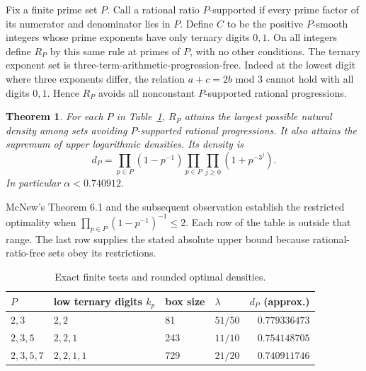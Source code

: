 \documentclass[11pt]{article}
\newtheorem{theorem}{Theorem}[section]\newtheorem{lemma}[theorem]{Lemma}\newtheorem{corollary}[theorem]{Corollary}
\begin{document}
Fix a finite prime set $P$. Call a rational ratio $P$-supported if every prime factor of its numerator and denominator lies in $P$. Define $C$ to be the positive $P$-smooth integers whose prime exponents have only ternary digits $0,1$. On all integers define $R_P$ by this same rule at primes of $P$, with no other conditions. The ternary exponent set is three-term-arithmetic-progression-free. Indeed at the lowest digit where three exponents differ, the relation $a+c=2b$ mod $3$ cannot hold with all digits $0,1$. Hence $R_P$ avoids all nonconstant $P$-supported rational progressions.
\begin{theorem}\label{t:rankin}
For each $P$ in Table~\ref{tab:rankin}, $R_P$ attains the largest possible natural density among sets avoiding $P$-supported rational progressions. It also attains the supremum of upper logarithmic densities. Its density is
\[
 d_P=\prod_{p\in P}(1-p^{-1})\prod_{p\in P}\prod_{j\ge0}(1+p^{-3^j}).
\]
In particular $\alpha<0.740912$.
\end{theorem}
McNew's Theorem 6.1 and the subsequent observation establish the restricted optimality when $\prod_{p\in P}(1-p^{-1})^{-1}\le2$. Each row of the table is outside that range. The last row supplies the stated absolute upper bound because rational-ratio-free sets obey its restrictions.
\begin{table}[ht]\centering\small\caption{Exact finite tests and rounded optimal densities.}\label{tab:rankin}
\begin{tabular}{llllr}\toprule
$P$ & low ternary digits $k_p$ & box size & $\lambda$ & $d_P$ (approx.)\\\midrule
$2,3$ & $2,2$ &81& $51/50$ & $0.779336473$\\
$2,3,5$ & $2,2,1$ &243& $11/10$ & $0.754148705$\\
$2,3,5,7$ & $2,2,1,1$ &729& $21/20$ & $0.740911746$\\\bottomrule
\end{tabular}\end{table}
\end{document}
